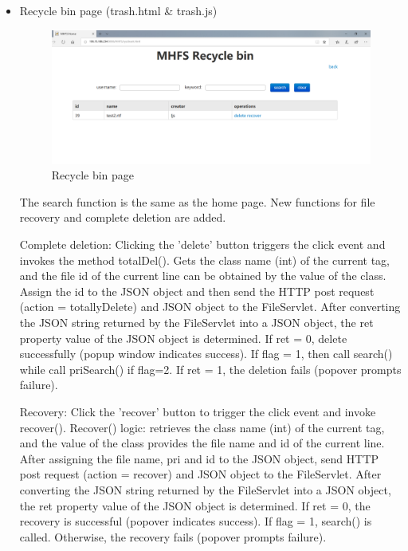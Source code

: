 \documentclass[a4paper,11pt]{article}
\begin{document}
\begin{itemize}
\item Recycle bin page (trash.html \& trash.js)

\begin{figure}[ht]
    \centering
    \includegraphics[scale=0.3]{5p.png}
    \caption{Recycle bin page}
    \label{fig:Recycle bin page}
\end{figure}

\par The search function is the same as the home page. New functions for file recovery and complete deletion are added.

\par Complete deletion: Clicking the 'delete' button triggers the click event and invokes the method totalDel(). 
Gets the class name (int) of the current tag, and the file id of the current line can be obtained by the value of the class. Assign the id to the JSON object and then send the HTTP post request (action = totallyDelete) and JSON object to the FileServlet. After converting the JSON string returned by the FileServlet into a JSON object, the ret property value of the JSON object is determined. If ret = 0, delete successfully (popup window indicates success). If flag = 1, then call search() while call priSearch() if flag=2. If ret = 1, the deletion fails (popover prompts failure).

\par Recovery: Click the 'recover' button to trigger the click event and invoke recover(). Recover() logic: retrieves the class name (int) of the current tag, and the value of the class provides the file name and id of the current line. After assigning the file name, pri and id to the JSON object, send HTTP post request (action = recover) and JSON object to the FileServlet. After converting the JSON string returned by the FileServlet into a JSON object, the ret property value of the JSON object is determined. If ret = 0, the recovery is successful (popover indicates success). If flag = 1, search() is called. Otherwise, the recovery fails (popover prompts failure).

\end{itemize}
\end{document}
